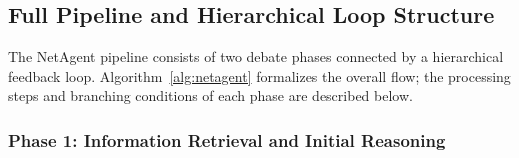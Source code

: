 \begin{enumerate}

\end{enumerate}







\subsection{Full Pipeline and Hierarchical Loop Structure}

The NetAgent pipeline consists of two debate phases connected by a hierarchical feedback loop.
Algorithm~\ref{alg:netagent} formalizes the overall flow; the processing steps and branching conditions of each phase are described below.

\subsubsection{Phase 1: Information Retrieval and Initial Reasoning}

